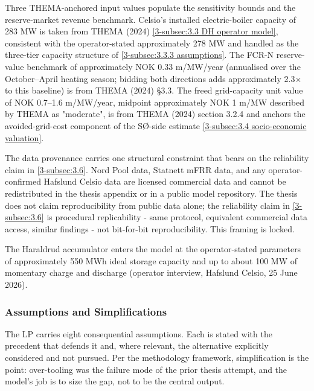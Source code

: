 Three THEMA-anchored input values populate the sensitivity bounds and the reserve-market revenue benchmark. Celsio's installed electric-boiler capacity of 283 MW is taken from THEMA (2024) \autoref{3-subsec:3.3 DH operator model}, consistent with the operator-stated approximately 278 MW and handled as the three-tier capacity structure of \autoref{3-subsec:3.3.3 assumptions}. The FCR-N reserve-value benchmark of approximately NOK 0.33 m/MW/year (annualised over the October–April heating season; bidding both directions adds approximately 2.3× to this baseline) is from THEMA (2024) §3.3. The freed grid-capacity unit value of NOK 0.7–1.6 m/MW/year, midpoint approximately NOK 1 m/MW described by THEMA as "moderate", is from THEMA (2024) section 3.2.4 and anchors the avoided-grid-cost component of the SØ-side estimate \autoref{3-subsec:3.4 socio-economic valuation}.

The data provenance carries one structural constraint that bears on the reliability claim in \autoref{3-subsec:3.6}. Nord Pool data, Statnett mFRR data, and any operator-confirmed Hafslund Celsio data are licensed commercial data and cannot be redistributed in the thesis appendix or in a public model repository. The thesis does not claim reproducibility from public data alone; the reliability claim in \autoref{3-subsec:3.6} is procedural replicability - same protocol, equivalent commercial data access, similar findings - not bit-for-bit reproducibility. This framing is locked.

The Haraldrud accumulator enters the model at the operator-stated parameters of approximately 550 MWh ideal storage capacity and up to about 100 MW of momentary charge and discharge (operator interview, Hafslund Celsio, 25 June 2026).

\subsubsection{Assumptions and Simplifications}
\label{3-subsec:3.3.3 assumptions}

The LP carries eight consequential assumptions. Each is stated with the precedent that defends it and, where relevant, the alternative explicitly considered and not pursued. Per the methodology framework, simplification is the point: over-tooling was the failure mode of the prior thesis attempt, and the model's job is to size the gap, not to be the central output.

